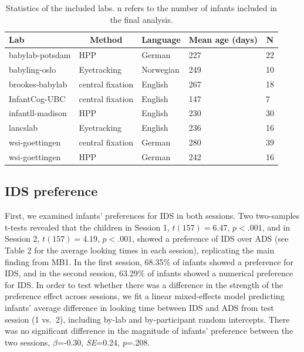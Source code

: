 \documentclass[
  man,floatsintext]{apa6}
\begin{document}
\begin{table}[tbp]

\begin{center}
\begin{threeparttable}

\caption{\label{tab:labs}Statistics of the included labs. n refers to the number of infants included in the final analysis.}

\begin{tabular}{lllll}
\toprule
Lab & \multicolumn{1}{c}{Method} & \multicolumn{1}{c}{Language} & \multicolumn{1}{c}{Mean age (days)} & \multicolumn{1}{c}{N}\\
\midrule
babylab-potsdam & HPP & German & 227 & 22\\
babyling-oslo & Eyetracking & Norwegian & 249 & 10\\
brookes-babylab & central fixation & English & 267 & 18\\
InfantCog-UBC & central fixation & English & 147 & 7\\
infantll-madison & HPP & English & 230 & 30\\
lancslab & Eyetracking & English & 236 & 16\\
wsi-goettingen & central fixation & German & 280 & 39\\
wsi-goettingen & HPP & German & 242 & 16\\
\bottomrule
\end{tabular}

\end{threeparttable}
\end{center}

\end{table}

\hypertarget{ids-preference}{%
\subsection{IDS preference}\label{ids-preference}}

First, we examined infants' preferences for IDS in both sessions. Two two-samples t-tests revealed that the children in Session 1, \(t(157) = 6.47\), \(p < .001\), and in Session 2, \(t(157) = 4.19\), \(p < .001\), showed a preference of IDS over ADS (see Table 2 for the average looking times in each session), replicating the main finding from MB1.
In the first session, 68.35\% of infants showed a preference for IDS, and in the second session, 63.29\% of infants showed a numerical preference for IDS.
In order to test whether there was a difference in the strength of the preference effect across sessions, we fit a linear mixed-effects model predicting infants' average difference in looking time between IDS and ADS from test session (1 vs.~2), including by-lab and by-participant random intercepts.
There was no significant difference in the magnitude of infants' preference between the two sessions, \(\beta\)=-0.30, \emph{SE}=0.24, \emph{p}=.208.
\end{document}
